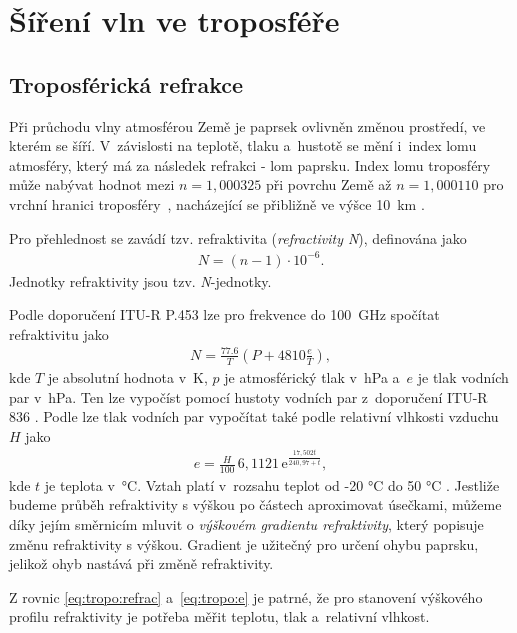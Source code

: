 \documentclass[twoside]{ctuthesis}
\newcommand{\mt}[1]{\text{#1}}
\theoremstyle{plain}
\theoremstyle{definition}
\theoremstyle{note}
\begin{document}
	\section{Šíření vln ve troposféře}
		\subsection{Troposférická refrakce}
		Při průchodu vlny atmosférou Země je paprsek ovlivněn změnou prostředí, ve kterém se šíří. V~závislosti na teplotě, tlaku a~hustotě se mění i~index lomu atmosféry, který má za následek refrakci - lom paprsku. Index lomu troposféry může nabývat hodnot mezi $n=1{,}000325$ při povrchu Země až $n=1{,}000110$ pro vrchní hranici troposféry~\cite{zaklady:sireni:vln}, nacházející se přibližně ve výšce 10~km \cite{web_tropo}.

		Pro přehlednost se zavádí tzv. refraktivita (\textit{refractivity N}), definována jako
		\begin{align}
			N = (n-1)\cdot 10^{-6}.
		\end{align}
		Jednotky refraktivity jsou tzv. \textit{N}-jednotky.

		Podle doporučení ITU-R P.453 \cite{ITU:refrac} lze pro frekvence do 100~GHz spočítat refraktivitu jako
		\begin{align}
			N = \frac{77.6}{T} \left(P + 4810\frac{e}{T}\right),
			\label{eq:tropo:refrac}
		\end{align}
		kde $T$ je absolutní hodnota v~K, $p$ je atmosférický tlak v~hPa a~$e$ je tlak vodních par v~hPa. Ten lze vypočíst pomocí hustoty vodních par z~doporučení ITU-R 836 \cite{ITU:vapour}. Podle \cite{ITU:refrac} lze tlak vodních par vypočítat také podle relativní vlhkosti vzduchu $H$ jako
		\begin{align}
			e = \frac{H}{100}\,6{,}1121\,\mt{e}^{\frac{17{,}502t}{240{,}97 + t}},
			\label{eq:tropo:e}
		\end{align}
		kde $t$ je teplota v~°C. Vztah platí v~rozsahu teplot od -20 °C do 50 °C \cite{zaklady:sireni:vln}. Jestliže budeme průběh refraktivity s výškou po částech aproximovat úsečkami, můžeme díky jejím směrnicím mluvit o \textit{výškovém gradientu refraktivity}, který popisuje změnu refraktivity s výškou. Gradient je užitečný pro určení ohybu paprsku, jelikož ohyb nastává při změně refraktivity. 

		Z rovnic \eqref{eq:tropo:refrac} a~\eqref{eq:tropo:e} je patrné, že pro stanovení výškového profilu refraktivity je potřeba měřit teplotu, tlak a~relativní vlhkost. 
\end{document}
